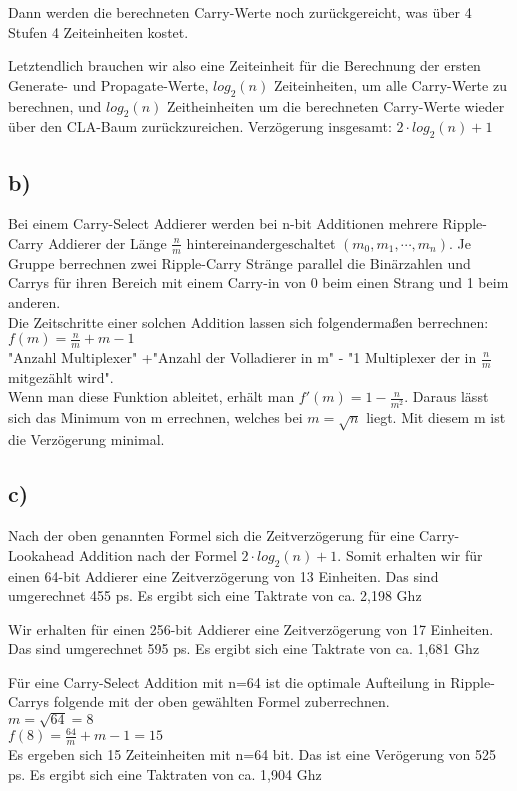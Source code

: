\documentclass{article}
\begin{document}
      Dann werden die berechneten Carry-Werte noch zurückgereicht, was über 4 Stufen 4 Zeiteinheiten kostet.

      Letztendlich brauchen wir also eine Zeiteinheit für die Berechnung der ersten Generate- und Propagate-Werte, $log_2(n)$ Zeiteinheiten, um alle Carry-Werte zu berechnen, und $log_2(n)$ Zeitheinheiten um die berechneten Carry-Werte wieder über den CLA-Baum zurückzureichen. Verzögerung insgesamt: $2 \cdot log_2(n) + 1$



    \subsection*{b)}
      
      Bei einem Carry-Select Addierer werden bei n-bit Additionen mehrere Ripple-Carry Addierer der Länge $\frac{n}{m}$  hintereinandergeschaltet $(m_0, m_1,\cdots,m_n)$. Je Gruppe berrechnen zwei Ripple-Carry Stränge parallel die Binärzahlen und Carrys für ihren Bereich mit einem Carry-in von  0 beim einen Strang und 1 beim anderen. \\
      Die Zeitschritte einer solchen Addition lassen sich folgendermaßen berrechnen:
      $f(m)=\frac{n}{m}+m-1$ \\
      "Anzahl Multiplexer" +"Anzahl der Volladierer in m" -  "1 Multiplexer der in $\frac{n}{m}$ mitgezählt wird". \\
      Wenn man diese Funktion ableitet, erhält man $f'(m)=1-\frac{n}{m^2}$. Daraus lässt sich das Minimum von m errechnen, welches bei $m=\sqrt{n}$ liegt.
      Mit diesem m ist die Verzögerung minimal. 

    \subsection*{c)}

      Nach der oben genannten  Formel sich die Zeitverzögerung für eine Carry-Lookahead Addition nach der Formel $2 \cdot log_2(n) + 1$. Somit erhalten wir für einen 64-bit Addierer eine Zeitverzögerung von 13 Einheiten. Das sind umgerechnet 455 ps. 
      Es ergibt sich eine Taktrate von ca. 2,198 Ghz

      Wir erhalten für einen 256-bit Addierer eine Zeitverzögerung von 17  Einheiten. Das sind umgerechnet 595 ps. 
      Es ergibt sich eine Taktrate von ca. 1,681 Ghz


      Für eine Carry-Select Addition mit n=64 ist die optimale Aufteilung in Ripple-Carrys folgende mit der oben gewählten Formel zuberrechnen. \\
      $m=\sqrt{64}=8$ \\
      $f(8)=\frac{64}{m}+m-1=15$\\
      Es ergeben sich 15 Zeiteinheiten mit n=64 bit. Das ist eine Verögerung von 525 ps.
      Es ergibt sich eine Taktraten von ca. 1,904 Ghz
\end{document}
